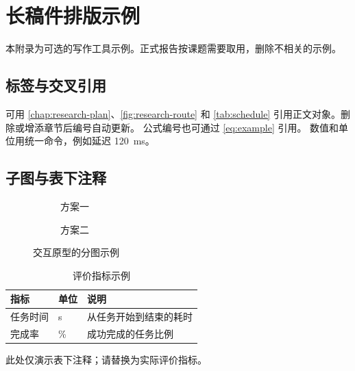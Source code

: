 \chapter{长稿件排版示例}
\label{app:examples}
本附录为可选的写作工具示例。正式报告按课题需要取用，删除不相关的示例。

\section{标签与交叉引用}
可用 \cref{chap:research-plan}、\cref{fig:research-route} 和
\cref{tab:schedule} 引用正文对象。删除或增添章节后编号自动更新。
公式编号也可通过 \cref{eq:example} 引用。
数值和单位用统一命令，例如延迟 \SI{120}{\milli\second}。

\section{子图与表下注释}
\begin{figure}[htbp]
  \centering
  \begin{subfigure}{0.45\linewidth}
    \centering
    \caption{方案一}\label{fig:prototype-a}
  \end{subfigure}\hfill
  \begin{subfigure}{0.45\linewidth}
    \centering
    \caption{方案二}\label{fig:prototype-b}
  \end{subfigure}
  \caption{交互原型的分图示例}\label{fig:prototype-comparison}
\end{figure}
\begin{table}[htbp]
  \centering
  \begin{threeparttable}
    \caption{评价指标示例}\label{tab:metrics}
    \begin{tabular}{lll}
      \toprule
      指标 & 单位 & 说明\\
      \midrule
      任务时间 & s & 从任务开始到结束的耗时\tnote{a}\\
      完成率 & \% & 成功完成的任务比例\\
      \bottomrule
    \end{tabular}
    \begin{tablenotes}
      \item[a] 此处仅演示表下注释；请替换为实际评价指标。
    \end{tablenotes}
  \end{threeparttable}
\end{table}

